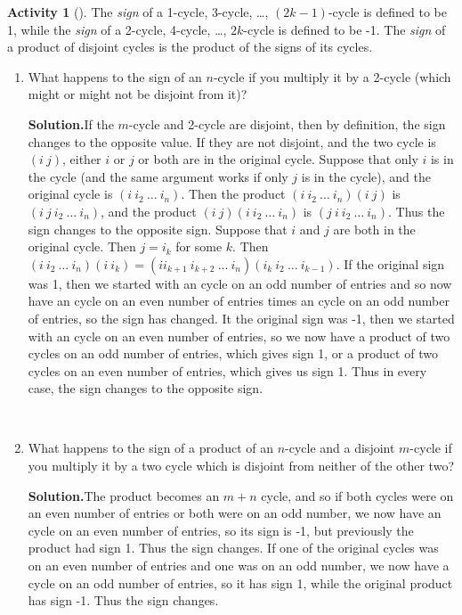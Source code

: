 \documentclass[10pt,]{book}
\theoremstyle{plain}
\theoremstyle{definition}
\newtheorem{activity}[project]{Activity}
\numberwithin{equation}{chapter}
\begin{document}
\begin{activity}[]\label{activity-274}
The \emph{sign} of a 1-cycle, 3-cycle, \dots{}, \((2k-1)\)-cycle is defined to be 1, while the \emph{sign} of a 2-cycle, 4-cycle, \dots{}, \(2k\)-cycle is defined to be -1. The \emph{sign} of a product of disjoint cycles is the product of the signs of its cycles.%
~\par
\begin{enumerate}[label=(\alph*)]
 \item What happens to the sign of an \(n\)-cycle if you multiply it by a 2-cycle (which might or might not be disjoint from it)?%
\par\medskip\noindent%
\textbf{Solution.}\quad If the \(m\)-cycle and 2-cycle are disjoint, then by definition, the sign changes to the opposite value. If they are not disjoint, and the two cycle is \((i\
j)\), either \(i\) or \(j\) or both are in the original cycle. Suppose that only \(i\) is in the cycle (and the same argument works if only \(j\) is in the cycle), and the original cycle is \((i\ i_2\ \ldots\ i_n)\). Then the product \((i\ i_2\
\ldots\ i_n)(i\ j)\) is \((i\ j\ i_2\ \ldots\ i_n)\), and the product \((i\ j)(i\ i_2\ \ldots\ i_n)\) is \((j\ i\
i_2\
\ldots\ i_n)\). Thus the sign changes to the opposite sign. Suppose that \(i\) and \(j\) are both in the original cycle. Then \(j= i_k\) for some \(k\). Then \((i\ i_2\ \ldots\
i_n)(i\ i_k)=(i i_{k+1}\ i_{k+2}\ \ldots\ i_n)(i_k\ i_2\ \ldots\ i_{k-1})\). If the original sign was 1, then we started with an cycle on an odd number of entries and so now have an cycle on an even number of entries times an cycle on an odd number of entries, so the sign has changed. It the original sign was -1, then we started with an cycle on an even number of entries, so we now have a product of two cycles on an odd number of entries, which gives sign 1, or a product of two cycles on an even number of entries, which gives us sign 1. Thus in every case, the sign changes to the opposite sign.%

~\par
\item What happens to the sign of a product of an \(n\)-cycle and a disjoint \(m\)-cycle if you multiply it by a two cycle which is disjoint from neither of the other two?%
\par\medskip\noindent%
\textbf{Solution.}\quad The product becomes an \(m+n\) cycle, and so if both cycles were on an even number of entries or both were on an odd number, we now have an cycle on an even number of entries, so its sign is -1, but previously the product had sign 1. Thus the sign changes. If one of the original cycles was on an even number of entries and one was on an odd number, we now have a cycle on an odd number of entries, so it has sign 1, while the original product has sign -1. Thus the sign changes.%


\end{enumerate}
\end{activity}
\end{document}
